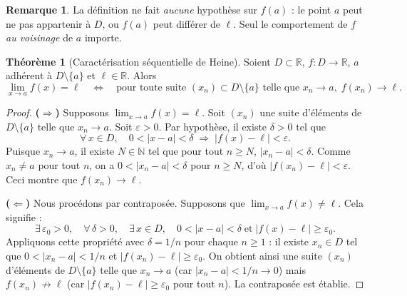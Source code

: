 \documentclass[12pt,a4paper,openany]{book}
\theoremstyle{definition}
\newtheorem{theoreme}{Théorème}[chapter]
\newtheorem{remarque}{Remarque}[chapter]
\newcommand{\N}{\mathbb{N}}
\newcommand{\R}{\mathbb{R}}
\begin{document}
\begin{remarque}\label{rem:limite-valeur-en-a}
La définition ne fait \emph{aucune} hypothèse sur $f(a)$ : le point $a$ peut ne pas appartenir à $D$, ou $f(a)$ peut différer de $\ell$. Seul le comportement de $f$ \emph{au voisinage} de $a$ importe.
\end{remarque}

\begin{theoreme}[Caractérisation séquentielle de Heine]\label{thm:heine-limite}
Soient $D \subset \R$, $f \colon D \to \R$, $a$ adhérent à $D \setminus \{a\}$ et $\ell \in \R$. Alors
\[
  \lim_{x \to a} f(x) = \ell
  \quad\Longleftrightarrow\quad
  \text{pour toute suite } (x_n) \subset D \setminus \{a\} \text{ telle que } x_n \to a,\;
  f(x_n) \to \ell.
\]
\end{theoreme}

\begin{proof}
\textbf{($\Rightarrow$)} Supposons $\lim_{x \to a} f(x) = \ell$. Soit $(x_n)$ une suite d'éléments de $D \setminus \{a\}$ telle que $x_n \to a$. Soit $\varepsilon > 0$. Par hypothèse, il existe $\delta > 0$ tel que
\[
  \forall\, x \in D,\quad 0 < |x - a| < \delta \;\Longrightarrow\; |f(x) - \ell| < \varepsilon.
\]
Puisque $x_n \to a$, il existe $N \in \N$ tel que pour tout $n \geqslant N$, $|x_n - a| < \delta$. Comme $x_n \neq a$ pour tout $n$, on a $0 < |x_n - a| < \delta$ pour $n \geqslant N$, d'où $|f(x_n) - \ell| < \varepsilon$. Ceci montre que $f(x_n) \to \ell$.

\medskip
\textbf{($\Leftarrow$)} Nous procédons par contraposée. Supposons que $\lim_{x \to a} f(x) \neq \ell$. Cela signifie :
\[
  \exists\, \varepsilon_0 > 0,\quad \forall\, \delta > 0,\quad
  \exists\, x \in D,\quad 0 < |x - a| < \delta \;\text{et}\; |f(x) - \ell| \geqslant \varepsilon_0.
\]
Appliquons cette propriété avec $\delta = 1/n$ pour chaque $n \geqslant 1$ : il existe $x_n \in D$ tel que $0 < |x_n - a| < 1/n$ et $|f(x_n) - \ell| \geqslant \varepsilon_0$. On obtient ainsi une suite $(x_n)$ d'éléments de $D \setminus \{a\}$ telle que $x_n \to a$ (car $|x_n - a| < 1/n \to 0$) mais $f(x_n) \not\to \ell$ (car $|f(x_n) - \ell| \geqslant \varepsilon_0$ pour tout $n$). La contraposée est établie.
\end{proof}
\end{document}
